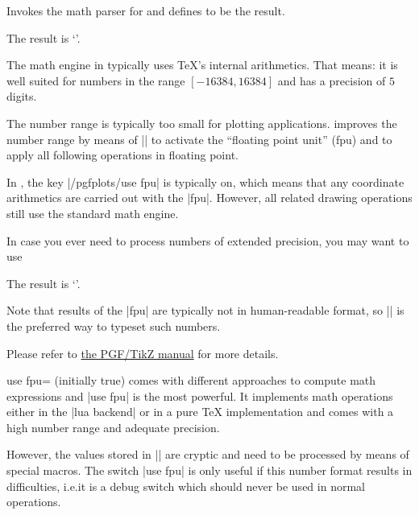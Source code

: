\begin{command}{\pgfmathparse{}}
    Invokes the \pgfname{} math parser for  and defines
    \declareandlabel{\pgfmathresult} to be the result.
\begin{codeexample}[]

The result is `\pgfmathresult'.
\end{codeexample}
    \noindent The math engine in \pgfname{} typically uses \TeX's internal
    arithmetics. That means: it is well suited for numbers in the range
    $[-16384,16384]$ and has a precision of $5$ digits.

    The number range is typically too small for plotting applications.
    \PGFPlots{} improves the number range by means of
    || to activate the ``floating point
    unit'' (fpu) and to apply all following operations in floating point.

    In \PGFPlots{}, the key |/pgfplots/use fpu| is typically on, which means
    that any coordinate arithmetics are carried out with the |fpu|. However,
    all \pgfname{} related drawing operations still use the standard math
    engine.

    In case you ever need to process numbers of extended precision, you may
    want to use
\begin{codeexample}[]
%

The result is `\pgfmathprintnumber{\pgfmathresult}'.
\end{codeexample}
    Note that results of the |fpu| are typically not in human-readable format,
    so |\pgfmathprintnumber| is the preferred way to typeset such numbers.

    Please refer to \href{https://tikz.dev/}{the PGF/TikZ manual} for more details.
\end{command}

\begin{pgfplotskey}{use fpu= (initially true)}
    \PGFPlots{} comes with different approaches to compute math expressions and
    |use fpu| is the most powerful. It implements math operations either in the
    |lua backend| or in a pure \TeX{} implementation and comes with a high
    number range and adequate precision.

    However, the values stored in |\pgfmathresult| are cryptic and need to be
    processed by means of special macros. The switch |use fpu| is only useful
    if this number format results in difficulties, i.e.\@ it is a debug switch
    which should never be used in normal operations.
\end{pgfplotskey}

